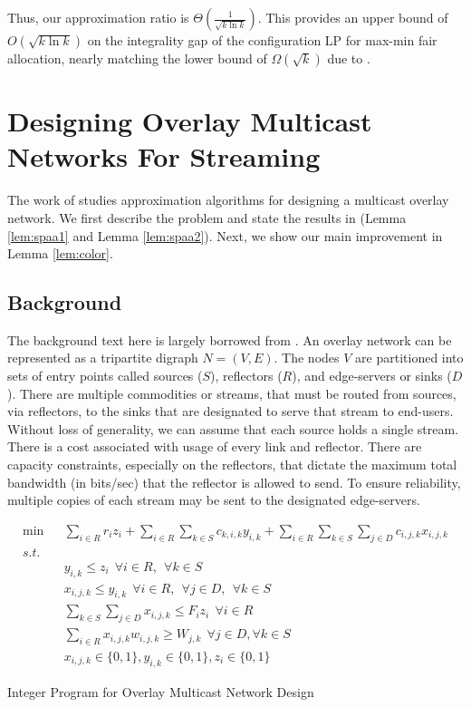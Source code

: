 Thus, our approximation ratio is $\Theta(\frac{1}{\sqrt{k\ln{k}}})$.
This provides an upper bound of $O(\sqrt{k\ln{k}})$ on the integrality gap of the configuration LP for max-min fair allocation, nearly
matching the  lower bound of $\Omega(\sqrt{k})$ due to \cite{bansal:stoc06}. 


\section{Designing Overlay Multicast Networks For Streaming}
\label{section:spaa}
The work of \cite{DBLP:conf/spaa/AndreevMMS03} studies approximation algorithms
for designing a multicast overlay network. We first describe the problem and state the results in \cite{DBLP:conf/spaa/AndreevMMS03} (Lemma \ref{lem:spaa1} and Lemma \ref{lem:spaa2}). Next, we show our main improvement in Lemma \ref{lem:color}.

\subsection{Background} The background text here is largely borrowed from \cite{DBLP:conf/spaa/AndreevMMS03}. An overlay network can be represented as a tripartite digraph $N=(V,E)$. The nodes $V$ are partitioned into sets of entry points called sources ($S$), reflectors ($R$), and edge-servers or sinks ($D$). There are multiple commodities or streams, that must be routed from sources, via reflectors, to the sinks that are designated to serve that stream to end-users. Without loss of generality, we can assume that each source holds a single stream. 
There is a cost associated with usage of every link and reflector. 
 There are capacity constraints, especially on the reflectors,
that dictate the maximum total bandwidth (in bits/sec) that the reflector is allowed to send. 
To ensure reliability, multiple copies of each stream may be sent to the designated edge-servers.
\begin{table*}
\begin{eqnarray}
\text{min} && \sum_{i \in R} r_{i}z_{i} +\sum_{i \in R}\sum_{k \in S}c_{k,i,k}y_{i,k}+\sum_{i \in R}\sum_{k \in S}\sum_{j \in D}c_{i,j,k}x_{i,j,k} \nonumber\\
s.t. &&\\
&& y_{i,k} \leq z_{i}~~\forall i \in R,~~\forall k \in S \label{eqn:cons1} \\
&& x_{i,j,k} \leq y_{i,k}~~\forall i \in R, ~~\forall j \in D, ~~\forall k \in S \label{eqn:cons2} \\
&& \sum_{k \in S} \sum_{j \in D} x_{i,j,k} \leq F_{i}z_{i}~~\forall i \in R
\label{eqn:fanout} \\
&& \sum_{i \in R}x_{i,j,k}w_{i,j,k} \geq W_{j,k}~~\forall j \in D, \forall k \in S \label{eqn:weight} \\
&& x_{i,j,k} \in \{0,1\}, y_{i,k} \in \{0,1\}, z_{i} \in \{0,1\}
\label{eqn:integrality}
\end{eqnarray}
\caption{Integer Program for Overlay Multicast Network Design}
\label{table:spaa}
\end{table*}

